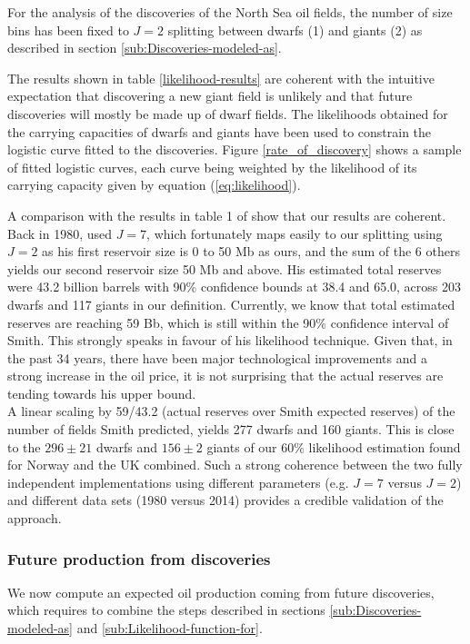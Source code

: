 \documentclass[review]{elsarticle}
\begin{document}
For the analysis of the discoveries of the North Sea oil fields, the number
of size bins has been fixed to $J=2$ splitting between dwarfs (1)
and giants (2) as described in section \ref{sub:Discoveries-modeled-as}.

The results shown in table \ref{likelihood-results} are coherent
with the intuitive expectation that discovering a new giant field
is unlikely and that future discoveries will mostly be made up of dwarf
fields. The likelihoods obtained for the carrying capacities of dwarfs
and giants have been used to constrain the logistic curve fitted to
the discoveries. Figure \ref{rate_of_discovery} shows a sample of
fitted logistic curves, each curve being weighted by the likelihood
of its carrying capacity given by equation (\ref{eq:likelihood}).

A comparison with the results in table 1 of \cite{Smith1980} show that our results are coherent. Back in 1980, \cite{Smith1980} used $J=7$, which fortunately maps easily to our splitting using $J=2$ as his first reservoir size is 0 to 50 Mb as ours, and the sum of the 6 others yields our second reservoir size 50 Mb and above. His estimated total reserves were 43.2 billion barrels with 90\% confidence bounds at 38.4 and 65.0, across 203 dwarfs and 117 giants in our definition. Currently, we know that total estimated reserves are reaching 59 Bb, which is still within the 90\% confidence interval of Smith. This strongly speaks in favour of his likelihood technique. Given that, in the past 34 years, there have been major technological improvements and a strong increase in the oil price, it is not surprising that the actual reserves are tending towards his upper bound.\\
A linear scaling by 59/43.2 (actual reserves over Smith expected reserves) of the number of fields Smith predicted, yields 277 dwarfs and 160 giants. This is close to the $296 \pm 21$ dwarfs and $156 \pm 2$ giants of our 60\% likelihood estimation found for Norway and the UK combined. Such a strong coherence between the two fully independent implementations using different parameters (e.g. $J=7$ versus $J=2$) and different data sets (1980 versus 2014) provides a credible validation of the approach.


\subsubsection{Future production from discoveries\label{sub:Future-production-from}}

We now compute an expected oil production coming from future
discoveries, which requires to combine the steps described in sections
\ref{sub:Discoveries-modeled-as} and \ref{sub:Likelihood-function-for}.
\end{document}
